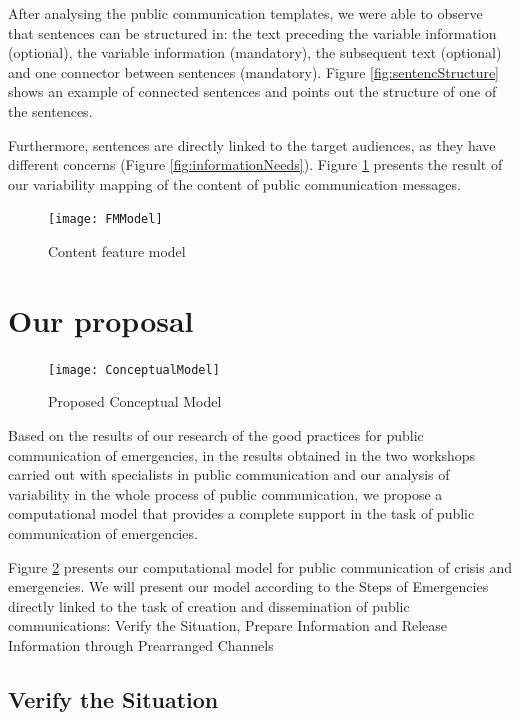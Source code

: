  
 After analysing the public communication templates, we were able to observe that sentences can be structured in: the text preceding the variable information (optional), the variable information (mandatory), the subsequent text (optional) and one connector between sentences (mandatory). Figure \ref{fig:sentencStructure}  shows an example of connected sentences and points out the structure of one of the sentences.
 
 Furthermore, sentences are directly linked to the target audiences, as they have different concerns (Figure \ref{fig:informationNeeds}). Figure \ref{fig:FMModel} presents the result of our variability mapping of the content of public communication messages.
 
    \begin{figure}[]
\begin{center}
  \texttt{[image: FMModel]}
\caption{Content feature model}
\label{fig:FMModel}
\end{center}
\end{figure}
 
\section{Our proposal}

\begin{figure}[]
\begin{center}
  \texttt{[image: ConceptualModel]}
\caption{Proposed Conceptual Model}
\label{fig:ConceptualModel}
\end{center}
\end{figure}

Based on the results of our research of the good practices for public communication of emergencies, in the results obtained in the two workshops carried out with specialists in public communication and our analysis of variability in the whole process of public communication, we propose a computational model that provides a complete support in the task of public communication of emergencies.   

Figure \ref{fig:ConceptualModel} presents our computational model for public communication of crisis and emergencies. We will present our model according to the Steps of Emergencies directly linked to the task of creation and dissemination of public communications: Verify the Situation, Prepare Information and Release Information through Prearranged Channels




\subsection{Verify the Situation}

